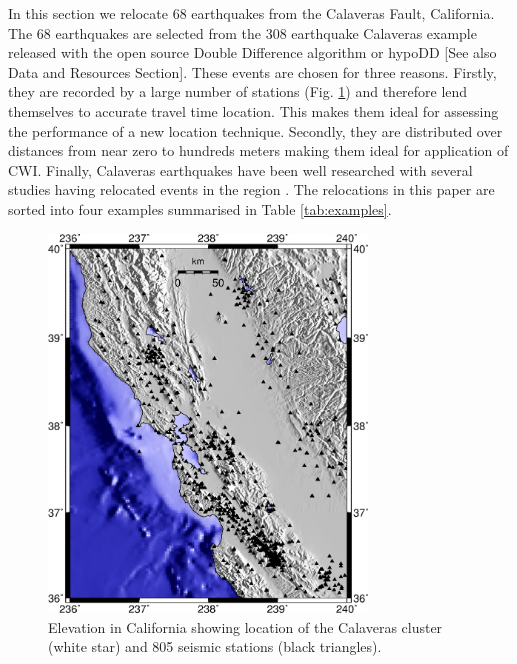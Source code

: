 \documentclass[extra, onecolumn, doublespacing]{gji}
\begin{document}
In this section we relocate 68 earthquakes from the Calaveras Fault,
California. The 68 earthquakes are selected from the 308 earthquake
Calaveras example released with the open source Double Difference
algorithm or hypoDD \citep{dr_Waldhauser00a, dr_Waldhauser01a}[See
also Data and Resources Section]. These events are chosen for three
reasons. Firstly, they are recorded by a large number of stations
(Fig. \ref{fig:-eqopti-California-Calaveras}) and therefore lend
themselves to accurate travel time location. This makes them ideal
for assessing the performance of a new location technique. Secondly,
they are distributed over distances from near zero to hundreds
meters making them ideal for application of CWI. Finally, Calaveras
earthquakes have been well researched with several studies having
relocated events in the region \citep{dr_Waldhauser01a,
dr_Schaff02a, dr_Waldhauser08a}. The relocations in this paper are
sorted into four examples summarised in Table \ref{tab:examples}.


\begin{figure}
\noindent\includegraphics[width =
20pc]{diags/CalaverasMap/gmt_california/CaliforniaCalaverasMap1.eps}
\caption{Elevation in California showing location of the Calaveras
cluster (white star) and 805 seismic stations (black triangles).}
\label{fig:-eqopti-California-Calaveras}
\end{figure}
\end{document}
